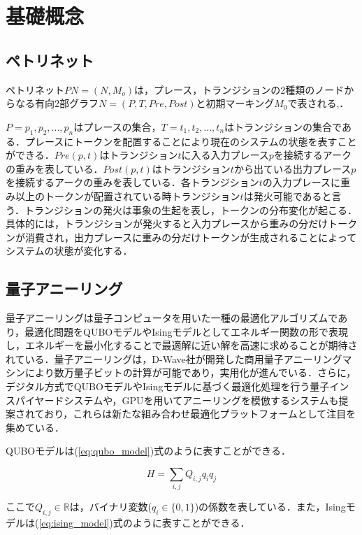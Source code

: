 \chapter{基礎概念}
\label{chap:concept}

\section{ペトリネット}
ペトリネット$PN = (N,M_o)$は，プレース，トランジションの2種類のノードからなる有向2部グラフ$N = (P,T,Pre,Post)$と初期マーキング$M_0$で表される\cite{murata},\cite{cpn}．

$P = {p_1, p_2, ..., p_n}$はプレースの集合，$T = {t_1, t_2, ..., t_n}$はトランジションの集合である．プレースにトークンを配置することにより現在のシステムの状態を表すことができる．$Pre(p,t)$はトランジション$t$に入る入力プレース$p$を接続するアークの重みを表している．$Post(p,t)$はトランジション$t$から出ている出力プレース$p$を接続するアークの重みを表している．各トランジション$t$の入力プレースに重み以上のトークンが配置されている時トランジション$t$は発火可能であると言う．トランジションの発火は事象の生起を表し，トークンの分布変化が起こる．具体的には，トランジションが発火すると入力プレースから重みの分だけトークンが消費され，出力プレースに重みの分だけトークンが生成されることによってシステムの状態が変化する．

\section{量子アニーリング}
量子アニーリングは量子コンピュータを用いた一種の最適化アルゴリズムであり，最適化問題をQUBOモデルやIsingモデルとしてエネルギー関数の形で表現し，エネルギーを最小化することで最適解に近い解を高速に求めることが期待されている．量子アニーリングは，D-Wave社が開発した商用量子アニーリングマシンにより数万量子ビットの計算が可能であり，実用化が進んでいる．さらに，デジタル方式でQUBOモデルやIsingモデルに基づく最適化処理を行う量子インスパイヤードシステムや，GPUを用いてアニーリングを模倣するシステムも提案されており，これらは新たな組み合わせ最適化プラットフォームとして注目を集めている．

QUBOモデルは(\ref{eq:qubo_model})式のように表すことができる．

\begin{equation}
H = \sum_{i,j} Q_{i,j}q_i q_j
\label{eq:qubo_model}
\end{equation}

ここで$Q_{i,j}\in \mathbb{R}$は，バイナリ変数($q_i \in \{0,1\}$)の係数を表している．また，Isingモデルは(\ref{eq:ising_model})式のように表すことができる．

